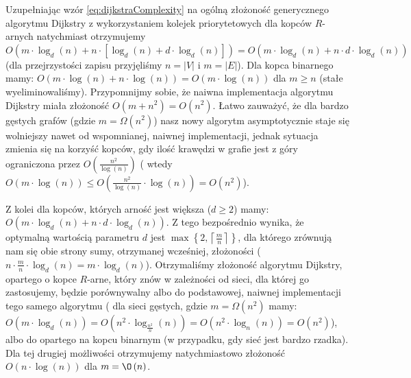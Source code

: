 Uzupełniając wzór \ref{eq:dijkstraComplexity} na ogólną złożoność generycznego algorytmu Dijkstry z wykorzystaniem kolejek priorytetowych dla kopców $R$-arnych natychmiast otrzymujemy $O \left( m \cdot \log_{d} \left( n \right) + n \cdot \left[ \log_{d} \left( n \right) + d \cdot \log_{d} \left( n \right) \right] \right) = O \left( m \cdot \log_{d} \left( n \right) + n \cdot d \cdot \log_{d} \left( n \right) \right) $ (dla przejrzystości zapisu przyjęliśmy $ n = \left| V\right|$ i $ m = \left| E \right|$). Dla kopca binarnego mamy: $O \left( m \cdot \log \left( n \right) + n \cdot \log \left( n \right) \right) = O \left( m \cdot \log \left( n \right) \right) $ dla $m \geqslant n $ (stałe wyeliminowaliśmy). Przypomnijmy sobie, że naiwna implementacja algorytmu Dijkstry miała złożoność $ O \left( m + n^{2} \right) = O \left( n^{2} \right)$. Łatwo zauważyć, że dla bardzo gęstych grafów (gdzie $ m = \Omega \left( n^{2} \right) $) nasz nowy algorytm asymptotycznie staje się wolniejszy nawet od wspomnianej, naiwnej implementacji, jednak sytuacja zmienia się na korzyść kopców, gdy ilość krawędzi w grafie jest z góry ograniczona przez $ O \left( \frac{n^{2}}{ \log \left( n \right) } \right)$ ( wtedy $ O \left( m \cdot \log \left( n \right) \right) \leqslant O \left( \frac{n^{2}}{\log \left( n \right)} \cdot \log \left( n \right) \right) = O \left( n^{2} \right)$).

Z kolei dla kopców, których arność jest większa ($d \geqslant 2$) mamy: $O \left( m \cdot \log_{d} \left( n \right) + n \cdot d \cdot \log_{d} \left( n \right) \right) $. Z tego bezpośrednio wynika, że optymalną wartością parametru $d$ jest $ \max \left\{ 2, \left \lceil \frac{m}{n} \right \rceil \right\} $, dla którego zrównują nam się obie strony sumy, otrzymanej wcześniej, złożoności ($ n \cdot \frac{m}{n} \cdot \log_{d} \left( n \right) = m \cdot \log_{d} \left( n \right) $). Otrzymaliśmy złożoność algorytmu Dijkstry, opartego o kopce $R$-arne, który znów w zależności od sieci, dla której go zastosujemy, będzie porównywalny albo do podstawowej, naiwnej implementacji tego samego algorytmu ( dla sieci gęstych, gdzie $ m = \Omega \left( n^{2} \right)$ mamy: $O \left( m \cdot \log_{d} \left( n \right) \right) = O \left( n^{2} \cdot \log_{\frac{n^{2}}{n}} \left( n \right) \right) = O \left( n^{2} \cdot \log_{n} \left( n \right) \right) = O \left( n^{2} \right)$), albo do opartego na kopcu binarnym (w przypadku, gdy sieć jest bardzo rzadka). Dla tej drugiej możliwości otrzymujemy natychmiastowo złożoność $O \left( n \cdot \log \left( n \right) \right)$ dla $m = \O \left( n \right)$.

